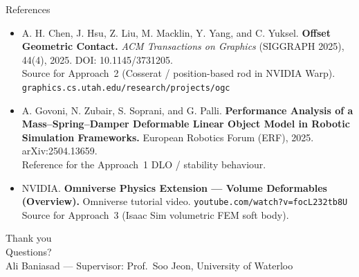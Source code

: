 \documentclass[aspectratio=169]{beamer}
\begin{document}
\begin{frame}{References}
  \footnotesize
  \begin{itemize}\itemsep4pt
    \item[{[1]}] A. H. Chen, J. Hsu, Z. Liu, M. Macklin, Y. Yang, and C. Yuksel.
          \textbf{Offset Geometric Contact.}
          \emph{ACM Transactions on Graphics} (SIGGRAPH 2025), 44(4), 2025.
          DOI: 10.1145/3731205. \\
          {\scriptsize Source for Approach~2 (Cosserat / position-based rod in NVIDIA Warp).
           \texttt{graphics.cs.utah.edu/research/projects/ogc}}
    \item[{[2]}] A. Govoni, N. Zubair, S. Soprani, and G. Palli.
          \textbf{Performance Analysis of a Mass--Spring--Damper Deformable Linear
          Object Model in Robotic Simulation Frameworks.}
          European Robotics Forum (ERF), 2025. arXiv:2504.13659. \\
          {\scriptsize Reference for the Approach~1 DLO / stability behaviour.}
    \item[{[3]}] NVIDIA. \textbf{Omniverse Physics Extension --- Volume Deformables (Overview).}
          Omniverse tutorial video. \texttt{youtube.com/watch?v=focL232tb8U} \\
          {\scriptsize Source for Approach~3 (Isaac Sim volumetric FEM soft body).}
  \end{itemize}
\end{frame}

\begin{frame}[plain]
  \centering\vfill
  {\Large Thank you}\\[1em]
  {\large Questions?}\\[2em]
  {\footnotesize Ali Baniasad --- Supervisor: Prof.\ Soo Jeon, University of Waterloo}
  \vfill
\end{frame}
\end{document}
